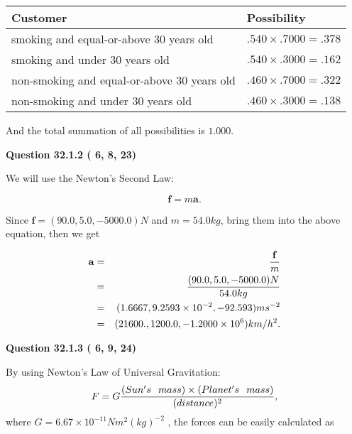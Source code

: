 \documentclass[12pt]{article}
\begin{document}
\noindent
\begin{tabular}{|l|l|}
\hline
Customer & Possibility \\
\hline
smoking  and  %
equal-or-above 30 years old  &
  $ %
.540 \times  %
.7000 =  %
.378$ \\
\hline
smoking  and  %
under 30 years old &
  $ %
.540 \times  %
.3000 =  %
.162$ \\
\hline
 non-smoking and  %
equal-or-above 30 years old  &
  $ %
.460 \times  %
.7000 =  %
.322$ \\
\hline
 non-smoking and  %
under 30 years old &
  $ %
.460 \times  %
.3000 =  %
.138$ \\
\hline
\end{tabular}
 
\noindent
And the total summation of all possibilities is $  %
1.000 $.
 
 
 
 
  
\vspace{0.2in}
  
{\textbf{\Large{Question
32.1.2 
 (          6,          8,         23)
}}}
  
  
 
 

We will use the Newton's Second Law:
 
\[
\mathbf{f}=m\mathbf{a}.
\]
 
Since $\mathbf{f}=( %
90.0,  %
5.0,  %
-5000.0 )N$
and $m= %
54.0kg$, bring them into the above equation, then we get
 
\begin{eqnarray*}
\mathbf{a}&=&\frac{\mathbf{f}}m  \\
&=&\frac{(
90.0 ,
5.0 ,
-5000.0 )N
}{ %
54.0 kg}  \\
&=&(
1.6667 ,
9.2593 \times 10^{-2},
-92.593
)ms^{-2} \\
&=&(
21600. ,
1200.0 ,
-1.2000 \times 10^{6}
)km/h^2.
\end{eqnarray*}
 
 
 
  
\vspace{0.2in}
  
{\textbf{\Large{Question
32.1.3 
 (          6,          9,         24)
}}}
  
  
 
 

By using Newton's Law of Universal Gravitation:
\[
F=G \frac{(Sun's \hspace{0.1in} mass) \times (Planet's \hspace{0.1in} mass)} { (distance)^2},
\]
where
$ G= %
6.67 \times 10^{-11}N m^{2}(kg)^{-2}$ , the forces can be easily calculated as
 
\end{document}
